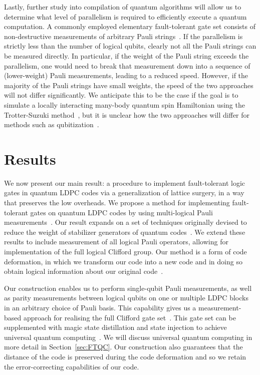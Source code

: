 \documentclass[reprint,
superscriptaddress,
 amsmath,amssymb,
 aps, longbibliography
]{revtex4-1}
\begin{document}
Lastly, further study into compilation of quantum algorithms will allow us to determine what level of parallelism is required to efficiently execute a quantum computation.  A commonly employed elementary fault-tolerant gate set consists of non-destructive measurements of arbitrary Pauli strings~\cite{Litinski19,Kim21,chamberland2021universal}. If the parallelism is strictly less than the number of logical qubits, clearly not all the Pauli strings can be measured directly. In particular, if the weight of the Pauli string exceeds the parallelism, one would need to break that measurement down into a sequence of (lower-weight) Pauli measurements, leading to a reduced speed. However, if the majority of the Pauli strings have small weights, the speed of the two approaches will not differ significantly. We anticipate this to be the case if the goal is to simulate a locally interacting many-body quantum spin Hamiltonian using the Trotter-Suzuki method~\cite{Wecker2014}, but it is unclear how the two approaches will differ for methods such as qubitization~\cite{Low2019}.

\section{\label{sec:measurements}Results}

We now present our main result:  a procedure to implement fault-tolerant logic gates in quantum LDPC codes via a generalization of lattice surgery, in a way that preserves the low overheads.  We propose a method for implementing fault-tolerant gates on quantum LDPC codes by using multi-logical Pauli measurements~\cite{Litinski19}. Our result expands on a set of techniques originally devised to reduce the weight of stabilizer generators of quantum codes~\cite{Hastings16,Hastings21}. We extend these results to include measurement of all logical Pauli operators, allowing for implementation of the full logical Clifford group. Our method is a form of code deformation, in which we transform our code into a new code and in doing so obtain logical information about our original code~\cite{Raussendorf07,Fowler12,Horsman12,Brown17,Litinski19,Vuillot19}.

Our construction enables us to perform single-qubit Pauli measurements, as well as parity measurements between logical qubits on one or multiple LDPC blocks in an arbitrary choice of Pauli basis. This capability gives us a measurement-based approach for realising the full Clifford gate set~\cite{Litinski19}. This gate set can be supplemented with magic state distillation and state injection to achieve universal quantum computing~\cite{Bravyi05}. We will discuss universal quantum computing in more detail in Section~\ref{sec:FTQC}. Our construction also guarantees that the distance of the code is preserved during the code deformation and so we retain the error-correcting capabilities of our code.
\end{document}
